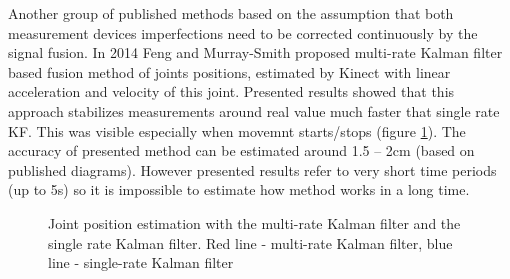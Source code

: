 \documentclass[9pt]{llncs}
\begin{document}
Another group of published methods based on the assumption that both measurement devices imperfections need to be corrected continuously by the signal fusion. In 2014 Feng and Murray-Smith \cite{Murray-Smith2014} proposed multi-rate Kalman filter based fusion method of joints positions, estimated by Kinect with linear acceleration and velocity of this joint. Presented results showed that this approach stabilizes measurements around real value much faster that single rate KF. This was visible especially when movemnt starts/stops (figure \ref{fig:feng-Stabilization}). The accuracy of presented method can be estimated around 1.5 -- 2cm (based on published diagrams). However presented results refer to very short time periods (up to 5s) so it is impossible to estimate how method works in a long time.\\

\begin{figure}[!htb]
	\vspace{2.5cm}
	\caption{Joint position estimation with the multi-rate Kalman filter and the single rate Kalman filter\cite{Murray-Smith2014}. Red line - multi-rate Kalman filter, blue line - single-rate Kalman filter}
	\label{fig:feng-Stabilization}
\end{figure}
\end{document}
